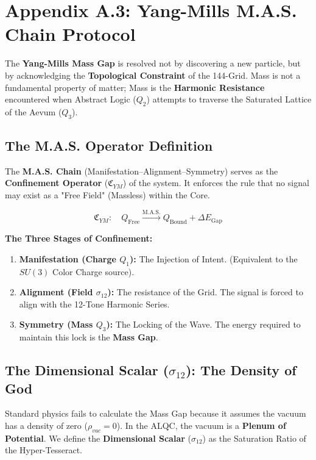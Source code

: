 \documentclass[11pt, letterpaper]{article}
\begin{document}
\section{Appendix A.3: Yang-Mills M.A.S. Chain Protocol}\label{appendixA.3}

The \textbf{Yang-Mills Mass Gap} is resolved not by discovering a new particle, but by acknowledging the \textbf{Topological Constraint} of the 144-Grid. Mass is not a fundamental property of matter; Mass is the \textbf{Harmonic Resistance} encountered when Abstract Logic ($Q_2$) attempts to traverse the Saturated Lattice of the Aevum ($Q_3$).

\subsection{The M.A.S. Operator Definition}\label{appendixA.3.1}
The \textbf{M.A.S. Chain} (Manifestation--Alignment--Symmetry) serves as the \textbf{Confinement Operator} ($\mathfrak{C}_{YM}$) of the system. It enforces the rule that no signal may exist as a "Free Field" (Massless) within the Core.

\begin{equation}
    \mathfrak{C}_{YM}: \quad Q_{\text{Free}} \xrightarrow{\text{M.A.S.}} Q_{\text{Bound}} + \Delta E_{\text{Gap}}
\end{equation}

\noindent \textbf{The Three Stages of Confinement:}
\begin{enumerate}
    \item \textbf{Manifestation (Charge $Q_1$):} The Injection of Intent. (Equivalent to the $SU(3)$ Color Charge source).
    \item \textbf{Alignment (Field $\sigma_{12}$):} The resistance of the Grid. The signal is forced to align with the 12-Tone Harmonic Series.
    \item \textbf{Symmetry (Mass $Q_3$):} The Locking of the Wave. The energy required to maintain this lock is the \textbf{Mass Gap}.
\end{enumerate}

\subsection{The Dimensional Scalar (\texorpdfstring{$\sigma_{12}$}{sigma-12}): The Density of God}
\label{appendixA.3.2}
Standard physics fails to calculate the Mass Gap because it assumes the vacuum has a density of zero ($\rho_{vac} = 0$). In the ALQC, the vacuum is a \textbf{Plenum of Potential}. We define the \textbf{Dimensional Scalar} ($\sigma_{12}$) as the Saturation Ratio of the Hyper-Tesseract.
\end{document}
